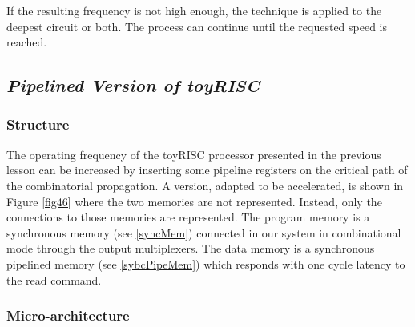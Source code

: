 If the resulting frequency is not high enough, the technique is applied to the deepest circuit or both. The process can continue until the requested speed is reached.

\subsection{{\bf {\em Pipelined Version of toyRISC}}}

\subsubsection{Structure}

The operating frequency of the toyRISC processor presented in the previous lesson can be increased by inserting some pipeline registers on the critical path of the combinatorial propagation. A version, adapted to be accelerated, is shown in Figure \ref{fig46} where the two memories are not represented.
Instead, only the connections to those memories are represented. The program memory is a synchronous memory (see \ref{syncMem}) connected in our system in combinational mode through the output multiplexers. The data memory is a synchronous pipelined memory (see \ref{sybcPipeMem}) which responds with one cycle latency to the read command.


\subsubsection{Micro-architecture}

